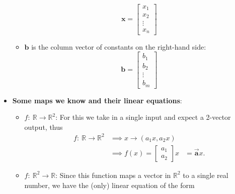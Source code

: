 \documentclass{report}
\begin{document}
\begin{itemize}
\begin{itemize}
                     \[
                         \mathbf{x} = 
                         \begin{bmatrix}
                             x_1 \\
                             x_2 \\
                             \vdots \\
                             x_n
                         \end{bmatrix}
                     \]
                 \item \(\mathbf{b}\) is the column vector of constants on the right-hand side:
                     \[
                         \mathbf{b} = 
                         \begin{bmatrix}
                             b_1 \\
                             b_2 \\
                             \vdots \\
                             b_m
                         \end{bmatrix}
                     \]
             \end{itemize}
            \item \textbf{Some maps we know and their linear equations}:
                \begin{itemize}
                    \item \textbf{$f:\ \mathbb{R} \to \mathbb{R}^{2}$}: For this we take in a single input and expect a 2-vector output, thus
                        \begin{align*}
                            f:\ \mathbb{R} \to \mathbb{R}^{2} &\implies x \to (a_{1}x, a_{2}x) \\
                                                              &\implies f(x) = 
                                                              \begin{bmatrix}
                                                                  a_{1} \\ a_{2}
                                                              \end{bmatrix} x 
                                                              &=\vec{\mathbf{a}}x
                          .\end{align*}
                      \item $f:\ \mathbb{R}^{2} \to \mathbb{R}$: Since this function maps a vector in $\mathbb{R}^{2}$ to a single real number, we have the (only) linear equation of the form

\end{itemize}
\end{itemize}
\end{document}
